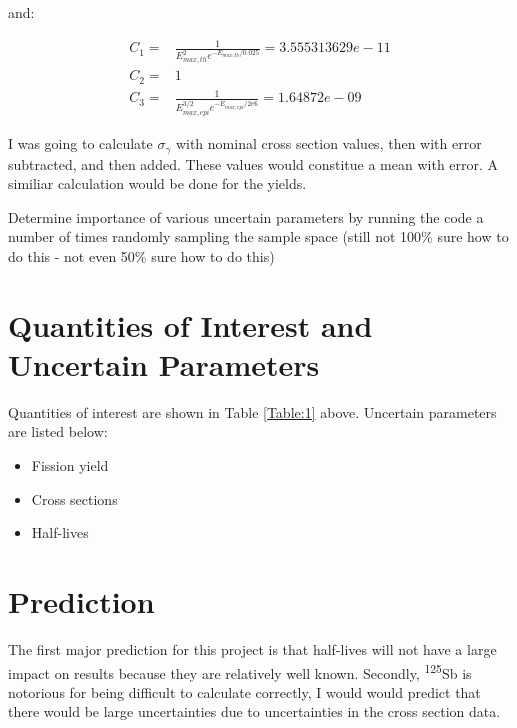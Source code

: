\documentclass[11pt,notitlepage]{article}
\newcommand{\tss}{\textsuperscript}
\begin{document}
\begin{todolist}
  and:

  \begin{align*}
    C_1=&\frac{1}{E^2_{max,th}e^{-E_{max,th}/0.025}}=3.555313629e-11
      \\
      C_2=&1\\
      C_3=&\frac{1}{E^{3/2}_{max,epi}e^{-E_{max,epi}/2e6}}=1.64872e-09
  \end{align*}

  I was going to calculate $\sigma_\gamma$ with nominal cross section
  values, then with error subtracted, and then added. These values would
  constitue a mean with error. A similiar calculation would be done for
  the yields.
  
\item{Determine importance of various uncertain parameters
  by running the code a number of times randomly sampling
  the sample space (still not 100\% sure how to do this -
  not even 50\% sure how to do this)}
\end{todolist}



\section{Quantities of Interest and Uncertain Parameters}

Quantities of interest are shown in Table \ref{Table:1} above.
Uncertain parameters are listed below:

\begin{itemize}
\item{Fission yield}
\item{Cross sections}
\item{Half-lives}
\end{itemize}


\section{Prediction}

The first major prediction for this project is that half-lives
will not have a large impact on results because they are
relatively well known. Secondly, \tss{125}Sb is notorious
for being difficult to calculate correctly, I would would predict that
there would be large uncertainties due to uncertainties in
the cross section data.



\end{document}
